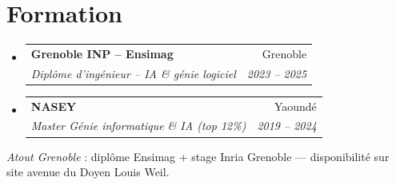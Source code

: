 \documentclass[a4paper,10.5pt]{article}
\makeatletter
\newcommand{\resumeSubheading}[4]{\vspace{2.5pt}\item\begin{tabular*}{0.97\textwidth}[t]{l@{\extracolsep{\fill}}r}\textbf{#1}&{#2}\\\textit{\small #3}&\textit{\small #4}\\\end{tabular*}\vspace{1pt}}
\newcommand{\resumeSubHeadingListStart}{\begin{itemize}[leftmargin=0.08in,label={}]}
\newcommand{\resumeSubHeadingListEnd}{\end{itemize}}
\makeatother
\begin{document}
\section{Formation}
\resumeSubHeadingListStart
  \resumeSubheading{Grenoble INP -- Ensimag}{Grenoble}{Dipl\^ome d'ing\'enieur -- IA \& g\'enie logiciel}{2023 -- 2025}
  \resumeSubheading{NASEY}{Yaound\'e}{Master G\'enie informatique \& IA (top 12\%)}{2019 -- 2024}
\resumeSubHeadingListEnd

\vspace{3pt}
\small{\textit{Atout Grenoble} : dipl\^ome Ensimag + stage Inria Grenoble --- disponibilit\'e sur site avenue du Doyen Louis Weil.}
\end{document}
